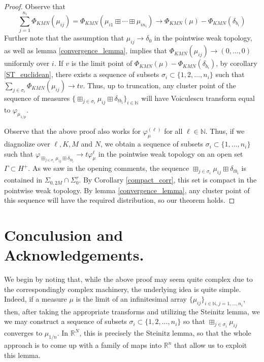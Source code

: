 \documentclass[11pt]{amsart}
\begin{document}
\begin{proof}
Observe that $$\sum_{j=1}^{n_{i}}\Phi_{KMN}(\mu_{ij}) = \Phi_{KMN}(\mu_{i1} \boxplus \cdots \boxplus \mu_{in_{i}}) \rightarrow \Phi_{KMN}(\mu) - \Phi_{KMN}(\delta_{b_{i}})$$
Further note that the assumption that $\mu_{ij}\rightarrow \delta_{0}$ in the pointwise weak topology, as well as lemma \ref{convergence_lemma}, implies that
$\Phi_{KMN}(\mu_{ij}) \rightarrow (0,\ldots,0)$ uniformly over $i$.  If $v$ is the limit point of $ \Phi_{KMN}(\mu) - \Phi_{KMN}(\delta_{b_{i}})$, by corollary
\ref{ST_euclidean}, there exists a sequence of subsets $\sigma_{i} \subset \{ 1,2,\ldots,n_{i} \}$ such that $\sum_{j\in \sigma_{i}} \Phi_{KMN}(\mu_{ij}) \rightarrow tv$.
Thus, up to truncation, any cluster point of the sequence of measures $\{\boxplus_{j\in \sigma_{i}} \mu_{ij} \boxplus \delta_{tb_{i}} \}_{i \in \mathbb{N}}$ will have
Voiculescu transform equal to $\varphi_{\mu_{1/p}}$.

Observe that the above proof also works for $\varphi_{\mu}^{(\ell)}$ for all $\ell \in \mathbb{N}$.  Thus, if we diagnolize over $\ell, K, M$ and $N$, we obtain a
sequence of subsets $\sigma_{i} \subset \{1,\ldots,n_{i} \}$ such that $\varphi_{\boxplus_{j\in\sigma_{i}}\mu_{ij} \boxplus \delta_{tb_{i}}}  \rightarrow t\varphi^{\ell}_{\mu}$ in 
the pointwise weak topology on an open set $\Gamma \subset H^{+}$.  As we saw in the opening comments, the sequence $\boxplus_{j\in\sigma_{i}}\mu_{ij} \boxplus \delta_{tb_{i}}$ is
 contained in $\Sigma_{0,2M} \cap \Sigma_{0}^{\tau}$.
By Corollary \ref{compact_corr}, this set is compact in the pointwise weak topology.  By lemma \ref{convergence_lemma}, any cluster point of this sequence 
will have the required distribution, so our theorem holds.
\end{proof}



\section{Conculusion and Acknowledgements.}\label{conclusion}

We begin by noting that, while the above proof may seem quite complex due to the correspondingly complex machinery, the underlying idea
is quite simple.  Indeed, if a measure $\mu$ is the limit of an infinitesimal array $\{ \mu_{ij} \}_{i\in \mathbb{N}, j=1,\ldots, n_{i}}$,
then, after taking the appropriate transforms and utilizing the Steinitz lemma, we  we may construct a sequence of subsets
$\sigma_{i} \subset \{1,2,\ldots,n_{i} \}$ so that $\boxplus_{j\in \sigma_{i}} \mu_{ij}$ converges to $\mu_{1/n}$.  In $\mathbb{R}^{N}$, this is precisely
 the Steinitz lemma, so that the whole approach is to come up with a family of maps into $\mathbb{R}^{n}$
that allow us to exploit this lemma.
\end{document}

